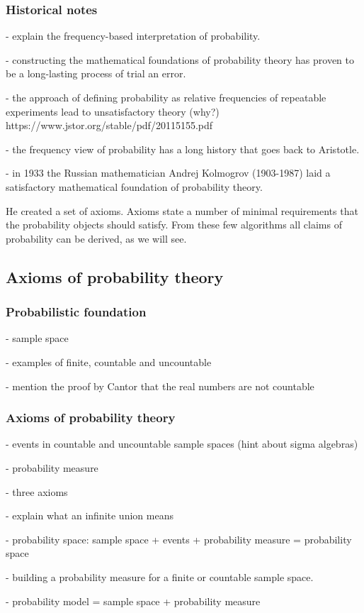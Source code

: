 \begin{frame}
\frametitle{Historical notes}

- explain the frequency-based interpretation of probability.

- constructing the mathematical foundations of probability theory has proven to be a long-lasting process of trial an error.  

- the approach of defining probability as relative frequencies of repeatable experiments lead to unsatisfactory theory (why?)
https://www.jstor.org/stable/pdf/20115155.pdf

- the frequency view of probability has a long history that goes back to Aristotle.

- in 1933 the Russian mathematician Andrej Kolmogrov (1903-1987) laid a satisfactory mathematical foundation of probability theory.

He created a set of axioms. Axioms state a number of minimal requirements that the probability objects should satisfy. From these few algorithms all claims of probability can be derived, as we will see.

\end{frame}

\subsection{Axioms of probability theory}

\begin{frame}
\frametitle{Probabilistic foundation}

- sample space

    - examples of finite, countable and uncountable

    - mention the proof by Cantor that the real numbers are not countable

\end{frame}

\begin{frame}
\frametitle{Axioms of probability theory}

- events in countable and uncountable sample spaces (hint about sigma algebras)

- probability measure

    - three axioms

        - explain what an infinite union means

- probability space: sample space + events + probability measure = probability space

- building a probability measure for a finite or countable sample space.

- probability model = sample space + probability measure

\end{frame}

